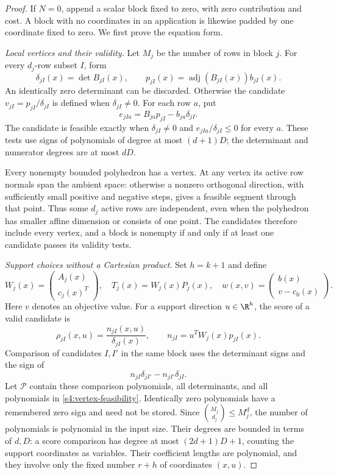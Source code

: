 \begin{proof}
If $N=0$, append a scalar block fixed to zero, with zero contribution
and cost. A block with no coordinates in an application is likewise
padded by one coordinate fixed to zero. We first prove the equation form.

\emph{Local vertices and their validity.}
Let $M_j$ be the number of rows in block $j$. For every $d_j$-row
subset $I$, form
\[
 \delta_{jI}(x)=\det B_{jI}(x),\qquad
 p_{jI}(x)=\operatorname{adj}(B_{jI}(x))b_{jI}(x).
\]
An identically zero determinant can be discarded. Otherwise the
candidate $v_{jI}=p_{jI}/\delta_{jI}$ is defined when
$\delta_{jI}\ne0$. For each row $a$, put
\begin{equation}
 e_{jIa}=B_{ja}p_{jI}-b_{ja}\delta_{jI}.
 \label{s4:vertex-feasibility}
\end{equation}
The candidate is feasible exactly when $\delta_{jI}\ne0$ and
$e_{jIa}/\delta_{jI}\le0$ for every $a$. These tests use signs of
polynomials of degree at most $(d+1)D$; the determinant and numerator
degrees are at most $dD$.

Every nonempty bounded polyhedron has a vertex. At any vertex its
active row normals span the ambient space: otherwise a nonzero
orthogonal direction, with sufficiently small positive and negative
steps, gives a feasible segment through that point. Thus some $d_j$
active rows are independent, even when the polyhedron has smaller
affine dimension or consists of one point. The candidates therefore
include every vertex, and a block is nonempty if and only if at least
one candidate passes its validity tests.

\emph{Support choices without a Cartesian product.}
Set $h=k+1$ and define
\[
 W_j(x)=\begin{pmatrix}A_j(x)\\c_j(x)^T\end{pmatrix},\quad
 T_j(x)=W_j(x)P_j(x),\quad
 w(x,v)=\begin{pmatrix}b(x)\\v-c_0(x)\end{pmatrix}.
\]
Here $v$ denotes an objective value. For a support direction
$u\in\R^h$, the score of a valid candidate is
\[
 \rho_{jI}(x,u)=\frac{n_{jI}(x,u)}{\delta_{jI}(x)},\qquad
 n_{jI}=u^TW_j(x)p_{jI}(x).
\]
Comparison of candidates $I,I'$ in the same block uses the determinant
signs and the sign of
\begin{equation}
 n_{jI}\delta_{jI'}-n_{jI'}\delta_{jI}.
 \label{s4:score-comparison}
\end{equation}
Let $\mathcal P$ contain these comparison polynomials, all determinants,
and all polynomials in \eqref{s4:vertex-feasibility}. Identically zero
polynomials have a remembered zero sign and need not be stored. Since
$\binom{M_j}{d_j}\le M_j^d$, the number of polynomials is polynomial
in the input size. Their degrees are bounded in terms of $d,D$: a
score comparison has degree at most $(2d+1)D+1$, counting the support
coordinates as variables. Their coefficient lengths are polynomial,
and they involve only the fixed
number $r+h$ of coordinates $(x,u)$.


\end{proof}
